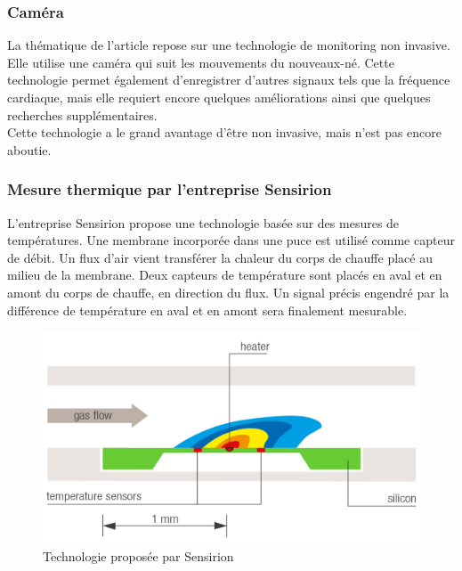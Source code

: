 \subsubsection{Caméra}
La thématique de l'article \cite{villarroel_non-contact_2019} repose sur une technologie de monitoring non invasive. Elle utilise une caméra qui suit les mouvements du nouveaux-né. 
Cette technologie permet également d'enregistrer d'autres signaux tels que la fréquence cardiaque, mais elle requiert encore quelques améliorations 
ainsi que quelques recherches supplémentaires. \\

Cette technologie a le grand avantage d'être non invasive, mais n'est pas encore aboutie. 

\subsubsection{Mesure thermique par l'entreprise Sensirion}
L'entreprise Sensirion propose une technologie basée sur des mesures de températures. Une membrane incorporée dans une puce est utilisé comme 
capteur de débit. Un flux d'air vient transférer la chaleur du corps de chauffe placé au milieu de la membrane. Deux capteurs de température 
sont placés en aval et en amont du corps de chauffe, en direction du flux. Un signal précis engendré par la différence de température en aval et  
en amont sera finalement mesurable. 
\begin{figure}[H]
    \centering
    \includegraphics[scale = 0.15]{assets/figures/Sensirion_tech.png}
    \caption{Technologie proposée par Sensirion\cite{noauthor_smart_nodate}}
    \label{fig:sensirion}
\end{figure}

